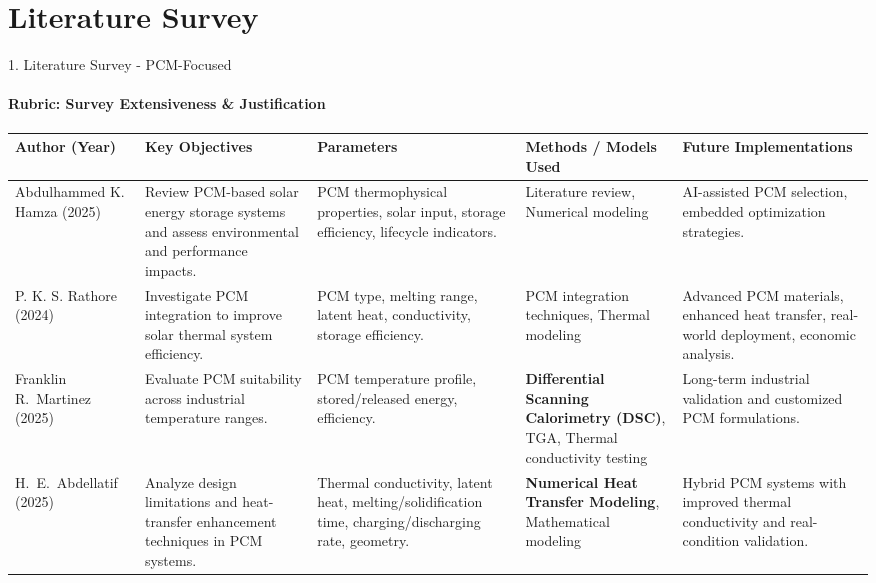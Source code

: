 \documentclass[aspectratio=169, 11pt]{beamer}
\begin{document}
\section{Literature Survey}
\begin{frame}{1. Literature Survey - PCM-Focused}
\framesubtitle{Rubric: Survey Extensiveness \& Justification}
\tiny
\renewcommand{\arraystretch}{1.5}
\begin{table}
\centering
\begin{tabular}{|p{1.6cm}|p{3.0cm}|p{2.8cm}|p{3.0cm}|p{3.0cm}|}
\hline
\textbf{Author (Year)} &
\textbf{Key Objectives} &
\textbf{Parameters} &
\textbf{Methods / Models Used} &
\textbf{Future Implementations} \\
\hline
Abdulhammed K. Hamza (2025) \cite{Hamza2025PCMReview} &
Review PCM-based solar energy storage systems and assess environmental and performance impacts. &
PCM thermophysical properties, solar input, storage efficiency, lifecycle indicators. &
Literature review, Numerical modeling &
AI-assisted PCM selection, embedded optimization strategies. \\
\hline
P. K. S. Rathore (2024) \cite{Rathore2024ThermalPCM} &
Investigate PCM integration to improve solar thermal system efficiency. &
PCM type, melting range, latent heat, conductivity, storage efficiency. &
PCM integration techniques, Thermal modeling &
Advanced PCM materials, enhanced heat transfer, real-world deployment, economic analysis. \\
\hline
Franklin R.~Martinez (2025) \cite{Martinez2025PCM_Industrial} &
Evaluate PCM suitability across industrial temperature ranges. &
PCM temperature profile, stored/released energy, efficiency. &
\textbf{Differential Scanning Calorimetry (DSC)}, TGA, Thermal conductivity testing &
Long-term industrial validation and customized PCM formulations. \\
\hline

H.~E.~Abdellatif (2025) \cite{Abdellatif2025PCM_Modeling} &
Analyze design limitations and heat-transfer enhancement techniques in PCM systems. &
Thermal conductivity, latent heat, melting/solidification time, charging/discharging rate, geometry. &
\textbf{Numerical Heat Transfer Modeling}, Mathematical modeling &
Hybrid PCM systems with improved thermal conductivity and real-condition validation. \\
\hline
\end{tabular}
\end{table}
\end{frame}
\end{document}
